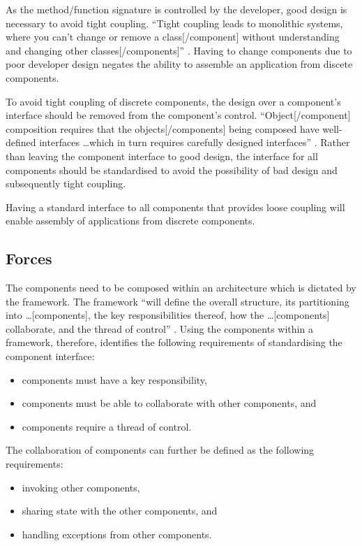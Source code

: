 \documentclass[prodmode]{style/acmlarge}
\begin{document}
As the method/function signature is controlled by the developer, good design is
necessary to avoid tight coupling.  ``Tight coupling leads to monolithic
systems, where you can't change or remove a class[/component] without
understanding and changing other classes[/components]'' \cite[p. 24-25]{gof}.
Having to change components due to poor developer design negates the ability to
assemble an application from discete components.

To avoid tight coupling of discrete components, the design over a component's
interface should be removed from the component's control. ``Object[/component]
composition requires that the objects[/components] being composed have
well-defined interfaces \ldots which in turn requires carefully designed
interfaces'' \cite[p. 19]{gof}.  Rather than leaving the component interface to
good design, the interface for all components should be standardised to avoid
the possibility of bad design and subsequently tight coupling.

Having a standard interface to all components that provides loose coupling will
enable assembly of applications from discrete components.


\subsection{Forces}

The components need to be composed within an architecture which is dictated by
the framework.  The framework ``will define the overall structure, its
partitioning into \ldots [components], the key responsibilities thereof, how the
\ldots [components] collaborate, and the thread of control'' \cite[p.26]{gof}. 
Using the components within a framework, therefore, identifies the following
requirements of standardising the component interface:
\begin{itemize}
  \item components must have a key responsibility,
  \item components must be able to collaborate with other components, and
  \item components require a thread of control.
\end{itemize}

The collaboration of components can further be defined as the following requirements:
\begin{itemize}
  \item invoking other components,
  \item sharing state with the other components, and
  \item handling exceptions from other components.
\end{itemize}
\end{document}
